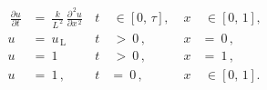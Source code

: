 \begin{align}
\, \frac{\partial u}{\partial t} 
& = \ \frac{k}{L^{\,2}} \, \frac{\partial^{\,2} u}{\partial x^{\,2}} \,
& t & \ \in \ \big[ \, 0, \, \tau \, \big] \,, \;&  x & \ \in \ \big[ \, 0, \, 1 \, \big] \,, \\[3pt] 
u
& = \ u_{\,\mathrm{L}} 
& t & \ > \ 0\,, \,&  x & = \ 0 \,, \\[3pt]
u
& = \ 1
& t & \ > \ 0\,, \,&  x & = \ 1 \,, \\[3pt]
u & = \ 1 \,,
& t & = \ 0\,, \,&  x & \ \in \ \big[ \, 0, \, 1 \, \big] \,.
\end{align}
